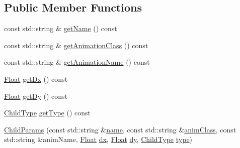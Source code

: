 \subsection*{Public Member Functions}
\begin{DoxyCompactItemize}
\item 
const std\+::string \& \hyperlink{classZeta_1_1LifeformClass_1_1ChildParams_ac5321462471652b1397268dff61e8a7a}{get\+Name} () const 
\item 
const std\+::string \& \hyperlink{classZeta_1_1LifeformClass_1_1ChildParams_a534c7e115c5a52f31a8702244a0348b3}{get\+Animation\+Class} () const 
\item 
const std\+::string \& \hyperlink{classZeta_1_1LifeformClass_1_1ChildParams_ab959e2b930366526ec0408f6135c1b7f}{get\+Animation\+Name} () const 
\item 
\hyperlink{namespaceZeta_a1e0a1265f9b3bd3075fb0fabd39088ba}{Float} \hyperlink{classZeta_1_1LifeformClass_1_1ChildParams_a674e1db35d2a4fadf87ebc8bab1d1da1}{get\+Dx} () const 
\item 
\hyperlink{namespaceZeta_a1e0a1265f9b3bd3075fb0fabd39088ba}{Float} \hyperlink{classZeta_1_1LifeformClass_1_1ChildParams_afbcfcdcc7b8d09639ffb24d98c0a6e32}{get\+Dy} () const 
\item 
\hyperlink{classZeta_1_1LifeformClass_1_1ChildParams_aad6ee0ed3431ee2d31268a851fb09bdc}{Child\+Type} \hyperlink{classZeta_1_1LifeformClass_1_1ChildParams_aa0efbac3f295316e0e4d895b1fda7c76}{get\+Type} () const 
\item 
\hyperlink{classZeta_1_1LifeformClass_1_1ChildParams_a99dfddd8b0b910534971c502850a0dfb}{Child\+Params} (const std\+::string \&\hyperlink{classZeta_1_1LifeformClass_1_1ChildParams_ae22918edf2f05d8fa5378fec5df11584}{name}, const std\+::string \&\hyperlink{classZeta_1_1LifeformClass_a0857894140b809d306d5ae432988e859}{anim\+Class}, const std\+::string \&anim\+Name, \hyperlink{namespaceZeta_a1e0a1265f9b3bd3075fb0fabd39088ba}{Float} \hyperlink{classZeta_1_1LifeformClass_1_1ChildParams_ad0327186e2721826893396f0de6665f1}{dx}, \hyperlink{namespaceZeta_a1e0a1265f9b3bd3075fb0fabd39088ba}{Float} \hyperlink{classZeta_1_1LifeformClass_1_1ChildParams_a23c7f18dbfe81afe4be803ddd9b09f72}{dy}, \hyperlink{classZeta_1_1LifeformClass_1_1ChildParams_aad6ee0ed3431ee2d31268a851fb09bdc}{Child\+Type} \hyperlink{classZeta_1_1LifeformClass_1_1ChildParams_a88dbed142675376bb55611550d44fa67}{type})
\end{DoxyCompactItemize}
